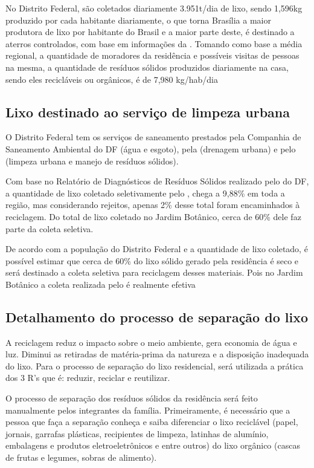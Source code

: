 	No Distrito Federal, são coletados diariamente 3.951t/dia de lixo, sendo 1,596kg produzido por cada habitante diariamente, o que torna Brasília a maior produtora de lixo por habitante do Brasil e a maior parte deste, é destinado a aterros controlados, com base em informações da \cite{ABRELPE}. Tomando como base a média regional, a quantidade de moradores da residência e possíveis visitas de pessoas na mesma, a quantidade de resíduos sólidos produzidos diariamente na casa, sendo eles recicláveis ou orgânicos, é de 7,980 kg/hab/dia

\subsection{Lixo destinado ao serviço de limpeza urbana}

	O Distrito Federal tem os serviços de saneamento prestados pela Companhia de Saneamento Ambiental do DF\cite{CAESB} (água e esgoto), pela \cite{Novacap} (drenagem urbana) e pelo \cite{SLU} (limpeza urbana e manejo de resíduos sólidos).

	Com base no Relatório de Diagnósticos de Resíduos Sólidos realizado pelo \cite{SLU} do DF, a quantidade de lixo coletado seletivamente pelo \cite{SLU}, chega a 9,88\% em toda a região, mas considerando rejeitos, apenas 2\% desse total foram encaminhados à reciclagem. Do total de lixo coletado no Jardim Botânico, cerca de 60\% dele faz parte da coleta seletiva.

	De acordo com a população do Distrito Federal e a quantidade de lixo coletado, é possível estimar que cerca de 60\% do lixo sólido gerado pela residência é seco e será destinado a coleta seletiva para reciclagem desses materiais. Pois no Jardim Botânico a coleta realizada pelo \cite{SLU} é realmente efetiva

\subsection{Detalhamento do processo de separação do lixo}

	A reciclagem reduz o impacto sobre o meio ambiente, gera economia de água e luz. Diminui as retiradas de matéria-prima da natureza e a disposição inadequada do lixo. Para o processo de separação do lixo residencial, será utilizada a prática dos 3 R's que é: reduzir, reciclar e reutilizar.

	O processo de separação dos resíduos sólidos da residência será feito manualmente pelos integrantes da família. Primeiramente, é necessário que a pessoa que faça a separação conheça e saiba diferenciar o lixo reciclável (papel, jornais, garrafas plásticas, recipientes de limpeza, latinhas de alumínio, embalagens e produtos eletroeletrônicos e entre outros) do lixo orgânico (cascas de frutas e legumes, sobras de alimento).

